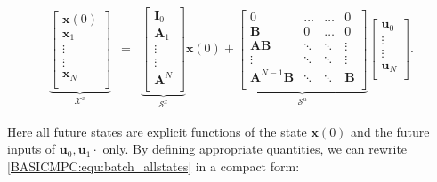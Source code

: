     \begin{equation}
        \begin{array}{rcl}
        \underbrace{
        \begin{bmatrix}
        \textbf{x}(0)\\
        \textbf{x}_1\\
        \vdots\\
        \vdots\\
        \textbf{x}_N\\
        \end{bmatrix}}_{\mathcal{X}^x}
        &=&
        \underbrace{
        \begin{bmatrix}
        \textbf{I}_0\\
        \textbf{A}_1\\
        \vdots\\
        \vdots\\
        \textbf{A}^N\\
        \end{bmatrix}}_{\mathcal{S}^x}\textbf{x}(0)+
        \underbrace{
        \begin{bmatrix}
        0& \dots& \dots& 0\\
        \textbf{B}& 0& \dots& 0\\
        \textbf{AB}& \ddots& \ddots& \vdots\\
        \vdots& \ddots& \ddots& \vdots\\
        \textbf{A}^{N-1}\textbf{B}& \ddots& \ddots& \textbf{B}\\
        \end{bmatrix}}_{\mathcal{S}^u}
        \begin{bmatrix}
        \textbf{u}_0\\
        \vdots\\
        \vdots\\
        \textbf{u}_N\\
        \end{bmatrix}.

		\end{array}
        \label{BASICMPC:equ:batch_allstates}
    \end{equation}

    Here all future states are explicit functions of the state $\textbf{x}(0)$ and the future inputs of $\textbf{u}_0,\textbf{u}_1\cdot$ only. By defining appropriate quantities, we can rewrite \ref{BASICMPC:equ:batch_allstates} in a compact form:

